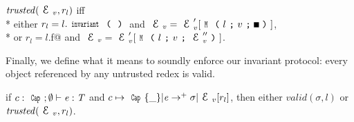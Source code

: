 \noindent $\mathit{trusted}(\ctx_v,r_l)$ iff\\*
\indent either
$r_l=l.\invariant$ and
$\ctx_v=\ctx_v'[\M{l}{v}{\square}]$,\\*
\indent or
$r_l=l$\Q@.f@ and
$\ctx_v=\ctx_v'[\M{l}{v}{\ctx_v''}]$.

\noindent Finally, we define what it means to soundly enforce our invariant protocol: every object referenced by any untrusted redex is valid.

\begin{theorem}[Soundness]\rm
if $c:\Kw{Cap};\emptyset\vdash \e: \T$ and
$c\mapsto\Kw{Cap}\{\_\}|\e\rightarrow^+ \sigma|\ctx_v[r_l]$, then
either $\mathit{valid}(\sigma,l)$ or $\mathit{trusted}(\ctx_v,r_l)$.
\end{theorem}



